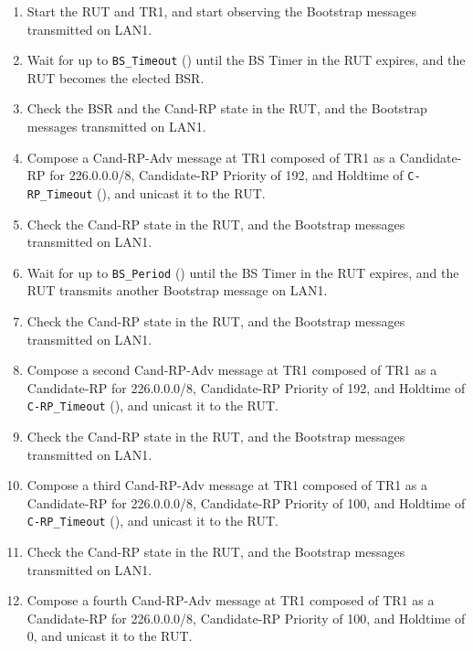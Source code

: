 \documentclass[11pt]{report}
\begin{document}
\begin{enumerate}

  \item Start the RUT and TR1, and start observing the Bootstrap messages
  transmitted on LAN1.

  \item Wait for up to \verb=BS_Timeout= ({\PimsmBSTimeout}) until the BS
  Timer in the RUT expires, and the RUT becomes the elected BSR.

  \item Check the BSR and the Cand-RP state in the RUT, and the Bootstrap
  messages transmitted on LAN1.

  \item Compose a Cand-RP-Adv message at TR1 composed of TR1 as a
   Candidate-RP for 226.0.0.0/8, Candidate-RP Priority of 192, and Holdtime of
   \verb=C-RP_Timeout= ({\PimsmCRPTimeout}), and unicast it to the RUT.

  \item Check the Cand-RP state in the RUT, and the Bootstrap
  messages transmitted on LAN1.

  \item Wait for up to \verb=BS_Period= ({\PimsmBSPeriod}) until the BS
  Timer in the RUT expires, and the RUT transmits another Bootstrap message on
  LAN1.

  \item Check the Cand-RP state in the RUT, and the Bootstrap
  messages transmitted on LAN1.

  \item Compose a second Cand-RP-Adv message at TR1 composed of TR1 as a
   Candidate-RP for 226.0.0.0/8, Candidate-RP Priority of 192, and Holdtime of
   \verb=C-RP_Timeout= ({\PimsmCRPTimeout}), and unicast it to the RUT.

  \item Check the Cand-RP state in the RUT, and the Bootstrap
  messages transmitted on LAN1.

  \item Compose a third Cand-RP-Adv message at TR1 composed of TR1 as a
   Candidate-RP for 226.0.0.0/8, Candidate-RP Priority of 100, and Holdtime of
   \verb=C-RP_Timeout= ({\PimsmCRPTimeout}), and unicast it to the RUT.

  \item Check the Cand-RP state in the RUT, and the Bootstrap
  messages transmitted on LAN1.

  \item Compose a fourth Cand-RP-Adv message at TR1 composed of TR1 as a
   Candidate-RP for 226.0.0.0/8, Candidate-RP Priority of 100, and Holdtime of
   0, and unicast it to the RUT.


\end{enumerate}
\end{document}

